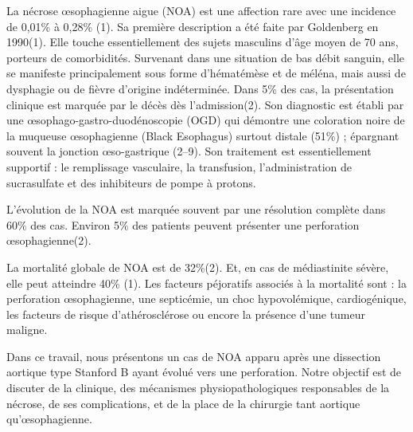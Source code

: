 \documentclass[./tfe.tex]{subfiles}
\begin{document}
La nécrose œsophagienne aigue (NOA) est une affection rare avec une incidence de 0,01\% à 0,28\% (1). Sa première description a été faite par Goldenberg en 1990(1). Elle touche essentiellement des sujets masculins d’âge moyen de 70 ans, porteurs de comorbidités. Survenant dans une situation de bas débit sanguin, elle se manifeste principalement sous forme d'hématémèse et de méléna, mais aussi de dysphagie ou de fièvre d'origine indéterminée. Dans 5\% des cas, la présentation clinique est marquée par le décès dès l’admission(2). Son diagnostic est établi par une œsophago-gastro-duodénoscopie (OGD) qui démontre une coloration noire de la muqueuse œsophagienne (Black Esophagus) surtout distale (51\%) ; épargnant souvent la jonction œso-gastrique (2–9). Son traitement est essentiellement supportif : le remplissage vasculaire, la transfusion, l’administration de sucrasulfate et des inhibiteurs de pompe à protons.

L’évolution de la NOA est marquée souvent par une résolution complète dans 60\% des cas. Environ 5\% des patients peuvent présenter une perforation œsophagienne(2).

La mortalité globale de NOA est de 32\%(2). Et, en cas de médiastinite sévère, elle peut atteindre 40\% (1). Les facteurs péjoratifs associés à la mortalité sont : la perforation œsophagienne, une septicémie, un choc hypovolémique, cardiogénique, les facteurs de risque d’athérosclérose ou encore la présence d’une tumeur maligne. 

Dans ce travail, nous présentons un cas de NOA apparu après une dissection aortique type Stanford B ayant évolué vers une perforation. Notre objectif est de discuter de la clinique, des mécanismes physiopathologiques responsables de la nécrose, de ses complications, et de la place de la chirurgie tant aortique qu’œsophagienne. 
\end{document}
